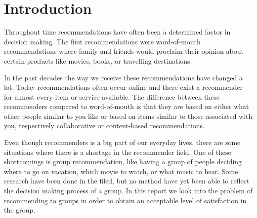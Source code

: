 \chapter{Introduction} 
Throughout time recommendations have often been a determined factor in decision making.
The first recommendations were word-of-mouth recommendations where family and friends would proclaim their opinion about certain products like movies, books, or travelling destinations. 

In the past decades the way we receive these recommendations have changed a lot. Today recommendations often occur online and there exist a recommender for almost every item or service available. The difference between these recommenders compared to word-of-mouth is that they are based on either what other people similar to you like or based on items similar to those associated with you, respectively collaborative or content-based recommendations.

Even though recommenders is a big part of our everyday lives, there are some situations where there is a shortage in the recommender field. One of these shortcomings is group recommendation, like having a group of people deciding where to go on vacation, which movie to watch, or what music to hear. Some research have been done in the filed, but no method have yet been able to reflect the decision making process of a group. In this report we look into the problem of recommending to groups in order to obtain an acceptable level of satisfaction in the group.



